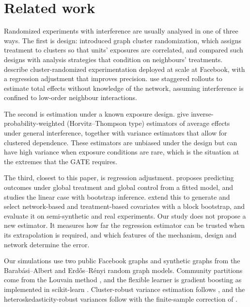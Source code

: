 \documentclass{article}
\begin{document}
\section{Related work}
\label{sec:related}
Randomized experiments with interference are usually analysed in one of three ways. The first is design: \citet{ugander2013} introduced graph cluster randomization, which assigns treatment to clusters so that units' exposures are correlated, and \citet{eckles2017} compared such designs with analysis strategies that condition on neighbours' treatments. \citet{karrer2021} describe cluster-randomized experimentation deployed at scale at Facebook, with a regression adjustment that improves precision. \citet{cortez2022} use staggered rollouts to estimate total effects without knowledge of the network, assuming interference is confined to low-order neighbour interactions.

The second is estimation under a known exposure design. \citet{aronow2017} give inverse-probability-weighted (Horvitz--Thompson type) estimators of average effects under general interference, together with variance estimators that allow for clustered dependence. These estimators are unbiased under the design but can have high variance when exposure conditions are rare, which is the situation at the extremes that the GATE requires.

The third, closest to this paper, is regression adjustment. \citet{chin2019} proposes predicting outcomes under global treatment and global control from a fitted model, and studies the linear case with bootstrap inference. \citet{han2023} extend this to generate and select network-based and treatment-based covariates with a block bootstrap, and evaluate it on semi-synthetic and real experiments. Our study does not propose a new estimator. It measures how far the regression estimator can be trusted when its extrapolation is required, and which features of the mechanism, design and network determine the error.

Our simulations use two public Facebook graphs \citep{traud2012,mcauley2012} and synthetic graphs from the Barab\'asi--Albert \citep{barabasi1999} and Erd\H{o}s--R\'enyi random graph models. Community partitions come from the Louvain method \citep{blondel2008}, and the flexible learner is gradient boosting as implemented in scikit-learn \citep{pedregosa2011}. Cluster-robust variance estimation follows \citet{cgm2011}, and the heteroskedasticity-robust variances follow \citet{white1980} with the finite-sample correction of \citet{mackinnon1985}.
\end{document}
